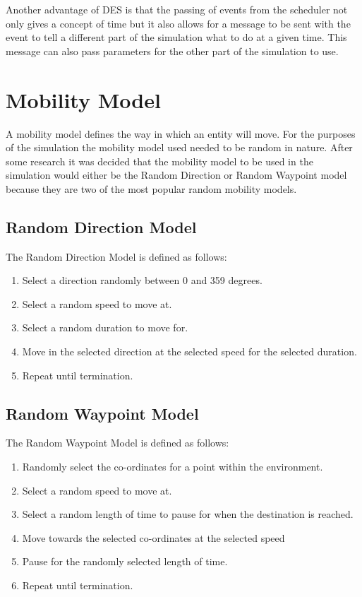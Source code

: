Another advantage of \ac{DES} is that the passing of events from the scheduler not only gives a concept of time but it also allows for a message to be sent with the event to tell a different part of the simulation what to do at a given time. This message can also pass parameters for the other part of the simulation to use.

\section{Mobility Model}\label{mobility}
A mobility model defines the way in which an entity will move. For the purposes of the simulation the mobility model used needed to be random in nature. After some research it was decided that the mobility model to be used in the simulation would either be the Random Direction or Random Waypoint model because they are two of the most popular random mobility models.~\cite{roy2010handbook}
\subsection{Random Direction Model}
The Random Direction Model is defined as follows:
\begin{enumerate}
\item Select a direction randomly between 0 and 359 degrees.
\item Select a random speed to move at.
\item Select a random duration to move for.
\item Move in the selected direction at the selected speed for the selected duration.
\item Repeat until termination.
\end{enumerate}
\subsection{Random Waypoint Model}
The Random Waypoint Model is defined as follows:
\begin{enumerate}
\item Randomly select the co-ordinates for a point within the environment.
\item Select a random speed to move at.
\item Select a random length of time to pause for when the destination is reached.
\item Move towards the selected co-ordinates at the selected speed
\item Pause for the randomly selected length of time.
\item Repeat until termination.
\end{enumerate}

